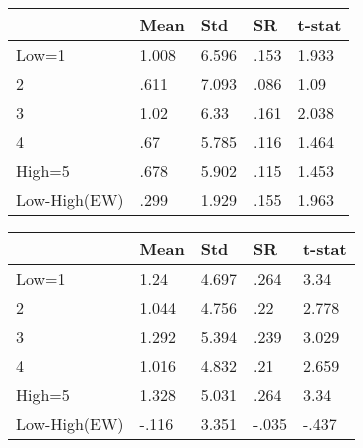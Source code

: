 \begin{table}[htbp]
\begin{tabular}{|l|l|l|l|l|}\hline  
 & Mean  & Std  & SR  & t-stat  \\ \hline  
Low=1 & 1.008 & 6.596 & .153 & 1.933 \\ \hline 
2 & .611 & 7.093 & .086 & 1.09 \\ \hline 
3 & 1.02 & 6.33 & .161 & 2.038 \\ \hline 
4 & .67 & 5.785 & .116 & 1.464 \\ \hline 
High=5 & .678 & 5.902 & .115 & 1.453 \\ \hline 
Low-High(EW) & .299 & 1.929 & .155 & 1.963 \\ \hline 
  \end{tabular}
\end{table}
\begin{table}[htbp]
\begin{tabular}{|l|l|l|l|l|}\hline  
 & Mean  & Std  & SR  & t-stat  \\ \hline  
Low=1 & 1.24 & 4.697 & .264 & 3.34 \\ \hline 
2 & 1.044 & 4.756 & .22 & 2.778 \\ \hline 
3 & 1.292 & 5.394 & .239 & 3.029 \\ \hline 
4 & 1.016 & 4.832 & .21 & 2.659 \\ \hline 
High=5 & 1.328 & 5.031 & .264 & 3.34 \\ \hline 
Low-High(EW) & -.116 & 3.351 & -.035 & -.437 \\ \hline 
  \end{tabular}
\end{table}
